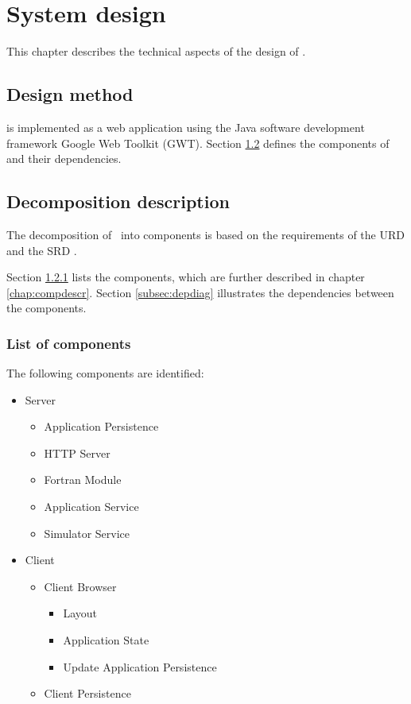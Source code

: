 \chapter{System design}
\label{chap:systdesign}
This chapter describes the technical aspects of the design of \projectname.

\section{Design method}
\projectname{} is implemented as a web application using the Java software development framework Google Web Toolkit (GWT). Section \ref{sec:decompdescr} defines the components of \projectname{} and their dependencies.


\section{Decomposition description}
\label{sec:decompdescr}
The decomposition of \projectname\ into components is based on the requirements of the URD \cite{urd} and the SRD \cite{srd}.

\fpstartparagraph{} Section \ref{subsec:complist} lists the components, which are further described in chapter \ref{chap:compdescr}. Section \ref{subsec:depdiag} illustrates the dependencies between the components.

\subsection{List of components}
\label{subsec:complist}
The following components are identiﬁed:

\begin{itemize}
\item Server
\begin{itemize}
\item Application Persistence
\item HTTP Server
\item Fortran Module
\item Application Service
\item Simulator Service
\end{itemize}
\item Client
\begin{itemize}
\item Client Browser
\begin{itemize}
\item Layout
\item Application State
\item Update Application Persistence
\end{itemize}
\item Client Persistence
\end{itemize}
\end{itemize}

